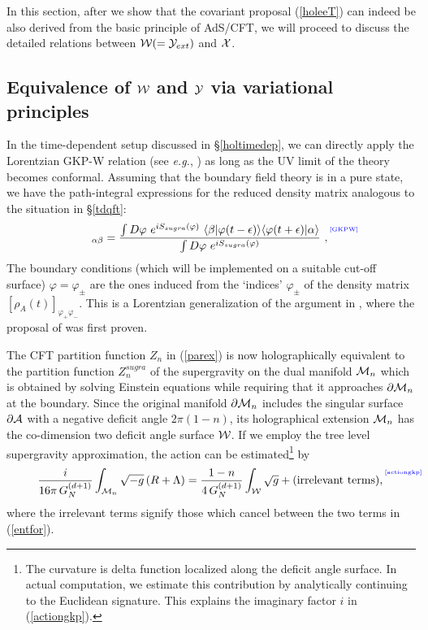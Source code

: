 \documentclass[12pt]{article}
\newcommand{\be}{\begin{equation}}
\newcommand{\ee}{\end{equation}}
\def\sec#1{\S \;\ref{#1}}
\def\req#1{(\ref{#1})}
\def\eg{{\it e.g.}}
\def\vp{\varphi}
\def\s{\sigma}
\def\CW{{\cal W}}
\def\CX{{\cal X}}
\def\CY{{\cal Y}}
\def\f#1#2{{\frac{#1}{#2}}}
\def\f#1#2{{\frac{#1}{#2}}}
\def\Label#1{\label{#1}%
{ \color{blue}{\smash{\hbox to0pt{\raise2ex\hbox{\tiny[#1]}\hss}}}}}
\def\bulk{{\cal M}}
\def\Gms{\CW}
\def\Lms{\CY}
\def\Xms{\CX}
\def\s{\sqrt}
\def\de{\partial}
\def\f {\frac}
\def\ap{\alpha}
\def\la{\langle}
\def\lb{\rangle}
\def\ep{\epsilon}
\def\vp{\varphi}
\begin{document}
In this section, after we show that the covariant proposal
(\ref{holeeT}) can indeed be also derived from the basic principle
of AdS/CFT, we will
  proceed to discuss the detailed relations between $\Gms(=\Lms_{ext})$ and
  $\Xms$.

\subsection{Equivalence of $\Gms$ and $\Lms$ via variational principles}
\label{gkpmotive}


In the time-dependent setup discussed in \sec{holtimedep}, we can
 directly apply the Lorentzian GKP-W relation  (see \eg,  \cite{Marolf:2004fy}) as
long as the UV limit of the theory becomes conformal. Assuming that
the boundary field theory is in a pure state, we have the
path-integral expressions for the reduced density matrix analogous
to the situation in \sec{tdqft}:
%
\be [\rho_A(t)]_{\ap
\beta}=\f{\int D\vp~ e^{iS_{sugra}(\vp)}~ \la \beta |\vp(t-\ep)\lb
\la \vp(t+\ep) | \ap \lb} {\int D\vp~
e^{iS_{sugra}(\vp)}} \ ,
\Label{GKPW}
\ee
%
 The boundary conditions (which will be implemented on a suitable cut-off surface) $\vp=\vp_{\pm}$ are the ones induced from the `indices'
$\vp_{\pm}$ of the density matrix $[\rho_A(t)]_{\vp_+ \vp_-}$. This
is a Lorentzian generalization of the argument in
\cite{Fursaev:2006ih}, where the proposal of \cite{Ryu:2006bv,
Ryu:2006ef} was first proven.

The CFT partition function $Z_n$ in \req{parex} is now
holographically equivalent to the partition function $Z^{sugra}_{n}$
of the supergravity on the dual manifold ${\cal M}_n$ which is
obtained by solving Einstein equations while requiring that it approaches
$\de{\cal{M}}_n$ at the boundary. Since the original
manifold $\de{\cal{M}}_n$ includes the singular surface $\de {\cal
A}$ with a negative deficit angle $2\pi(1-n)$, its holographical
extension ${\cal M}_n$ has the co-dimension two deficit angle surface
$\Gms$.
If we employ the tree level supergravity approximation, the action can be
estimated\footnote{The curvature is delta function localized
along the deficit angle surface. In actual computation, we estimate
this contribution by analytically continuing to the Euclidean
signature. This explains the imaginary factor $i$ in
\req{actiongkp}.} by
%
\be
\f{i}{16\pi\, G_N^{(d+1)}}\int_{\bulk_n}
\s{-g}\,(R+\Lambda)=\f{1-n}{4\, G_N^{(d+1)}}\int_{\Gms}\s{g}+(\mbox{irrelevant
terms}),
\Label{actiongkp}
\ee
%
where the irrelevant terms signify those
which cancel between the two terms in \req{entfor}.
\end{document}
